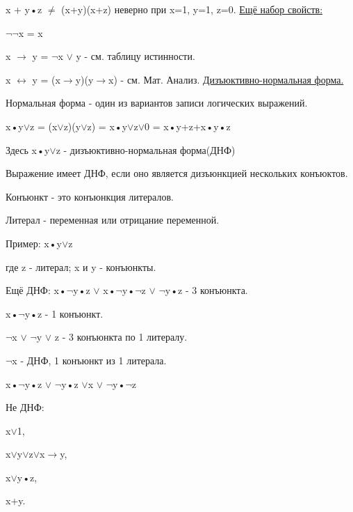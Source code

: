 \documentclass{article}
\begin{document}
x + y•z $\neq$ (x+y)(x+z) неверно при x=1, y=1, z=0.
\newline
\underline{Ещё набор свойств:} 

$\neg\neg$x = x

x $\rightarrow$ y = $\neg$x $\vee$ y - см. таблицу истинности.

x $\leftrightarrow$ y = (x$\rightarrow$y)(y$\rightarrow$x) - см. Мат. Анализ.
\newline
\underline{Дизъюктивно-нормальная форма.}

Нормальная форма - один из вариантов записи логических выражений.

x•y$\vee$z = (x$\vee$z)(y$\vee$z) = x•y$\vee$z$\vee$0 = x•y+z+x•y•z

Здесь x•y$\vee$z - дизъюктивно-нормальная форма(ДНФ)

Выражение имеет ДНФ, если оно является дизъюнкцией нескольких конъюктов. 

Конъюнкт - это конъюнкция литералов.

Литерал - переменная или отрицание переменной.

Пример: x•y$\vee$z

где z - литерал; x и y - конъюнкты.

Ещё ДНФ: x•$\neg$y•z $\vee$ x•$\neg$y•$\neg$z $\vee$ $\neg$y•z - 3 конъюнкта.

x•$\neg$y•z - 1 конъюнкт.

$\neg$x $\vee$ $\neg$y $\vee$ z - 3 конъюнкта по 1 литералу.

$\neg$x - ДНФ, 1 конъюнкт из 1 литерала.

x•$\neg$y•z $\vee$ $\neg$y•z $\vee$x $\vee$ $\neg$y•$\neg$z

Не ДНФ:

x$\vee$1,

x$\vee$y$\vee$z$\vee$x$\rightarrow$y,

x$\vee$y•z,

x+y.
\end{document}
